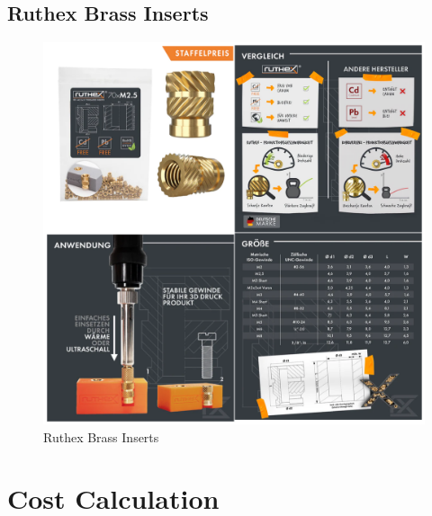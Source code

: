 \subsection{Ruthex Brass Inserts}

\begin{figure}[H]
    \centering
    \includegraphics[width=0.85\linewidth]{texs/appendix/data/techspecs/ruthex.png}
    \caption{Ruthex Brass Inserts}
    \label{fig:insert-1}
\end{figure}

\section{Cost Calculation}
\label{appendix:cost-calculation}


